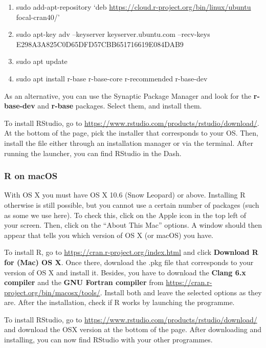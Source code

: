 \documentclass[
]{article}
\providecommand{\tightlist}{%
  \setlength{\itemsep}{0pt}\setlength{\parskip}{0pt}}
\begin{document}
\begin{enumerate}
\def\labelenumi{\arabic{enumi}.}
\tightlist
\item
  sudo add-apt-repository `deb \url{https://cloud.r-project.org/bin/linux/ubuntu} focal-cran40/'
\item
  sudo apt-key adv --keyserver keyserver.ubuntu.com --recv-keys E298A3A825C0D65DFD57CBB651716619E084DAB9
\item
  sudo apt update
\item
  sudo apt install r-base r-base-core r-recommended r-base-dev
\end{enumerate}

As an alternative, you can use the Synaptic Package Manager and look for the \textbf{r-base-dev} and \textbf{r-base} packages. Select them, and install them.

To install RStudio, go to \url{https://www.rstudio.com/products/rstudio/download/}. At the bottom of the page, pick the installer that corresponds to your OS. Then, install the file either through an installation manager or via the terminal. After running the launcher, you can find RStudio in the Dash.

\hypertarget{r-on-macos}{%
\subsubsection{R on macOS}\label{r-on-macos}}

With OS X you must have OS X 10.6 (Snow Leopard) or above. Installing R otherwise is still possible, but you cannot use a certain number of packages (such as some we use here). To check this, click on the Apple icon in the top left of your screen. Then, click on the ``About This Mac'' options. A window should then appear that tells you which version of OS X (or macOS) you have.

To install R, go to \url{https://cran.r-project.org/index.html} and click \textbf{Download R for (Mac) OS X}. Once there, download the .pkg file that corresponds to your version of OS X and install it. Besides, you have to download the \textbf{Clang 6.x compiler} and the \textbf{GNU Fortran compiler} from \url{https://cran.r-project.org/bin/macosx/tools/}. Install both and leave the selected options as they are. After the installation, check if R works by launching the programme.

To install RStudio, go to \url{https://www.rstudio.com/products/rstudio/download/} and download the OSX version at the bottom of the page. After downloading and installing, you can now find RStudio with your other programmes.
\end{document}
